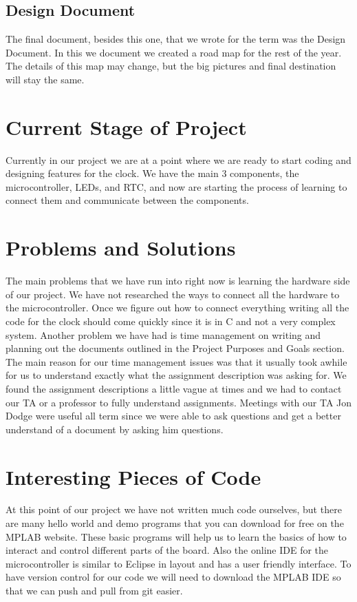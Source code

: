 \documentclass[10pt,draftclsnofoot,onecolumn]{IEEEtran}
\begin{document}
\subsection{Design Document}
The final document, besides this one, that we wrote for the term was the Design Document.
In this we document we created a road map for the rest of the year. 
The details of this map may change, but the big pictures and final destination will stay the same.

\section{Current Stage of Project}
Currently in our project we are at a point where we are ready to start coding and designing features for the clock.
We have the main 3 components, the microcontroller, LEDs, and RTC, and now are starting the process of learning to connect them and communicate between the components.

\section{Problems and Solutions}
The main problems that we have run into right now is learning the hardware side of our project.
We have not researched the ways to connect all the hardware to the microcontroller.
Once we figure out how to connect everything writing all the code for the clock should come quickly since it is in C and not a very complex system.
Another problem we have had is time management on writing and planning out the documents outlined in the Project Purposes and Goals section. 
The main reason for our time management issues was that it usually took awhile for us to understand exactly what the assignment description was asking for.
We found the assignment descriptions a little vague at times and we had to contact our TA or a professor to fully understand assignments.
Meetings with our TA Jon Dodge were useful all term since we were able to ask questions and get a better understand of a document by asking him questions.

\section{Interesting Pieces of Code}
At this point of our project we have not written much code ourselves, but there are many hello world and demo programs that you can download for free on the MPLAB website.
These basic programs will help us to learn the basics of how to interact and control different parts of the board. 
Also the online IDE for the microcontroller is similar to Eclipse in layout and has a user friendly interface. 
To have version control for our code we will need to download the MPLAB IDE so that we can push and pull from git easier. 
\end{document}
